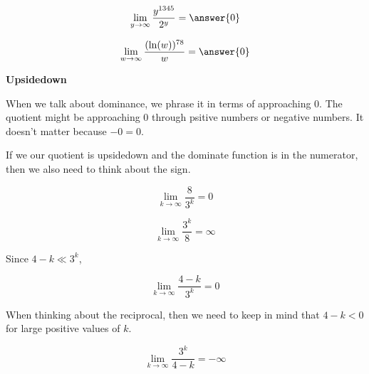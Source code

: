 \documentclass{ximera}
\begin{document}
\begin{question}

\[
\lim\limits_{y \to \infty} \frac{y^{1345}}{2^y} = \answer{0}
\]

\end{question}












\begin{question}

\[
\lim\limits_{w \to \infty} \frac{(\ln(w))^{78}}{w} = \answer{0}
\]

\end{question}






\begin{idea} \textbf{\textcolor{blue!55!black}{Upsidedown}}


When we talk about dominance, we phrase it in terms of approaching $0$.  The quotient might be approaching $0$ through psitive numbers or negative numbers.  It doesn't matter because $-0 = 0$.


If we our quotient is upsidedown and the dominate function is in the numerator, then we also need to think about the sign.


\end{idea}



\begin{example}




\[
\lim\limits_{k \to \infty} \frac{8}{3^k} = 0
\]



\[
\lim\limits_{k \to \infty} \frac{3^k}{8} = \infty 
\]




\end{example}









\begin{example}



Since $4 - k \ll 3^k$,

\[
\lim\limits_{k \to \infty} \frac{4 - k}{3^k} = 0
\]


When thinking about the reciprocal, then we need to keep in mind that $4 - k < 0$ for large positive values of $k$.



\[
\lim\limits_{k \to \infty} \frac{3^k}{4 - k} = -\infty 
\]




\end{example}
\end{document}
